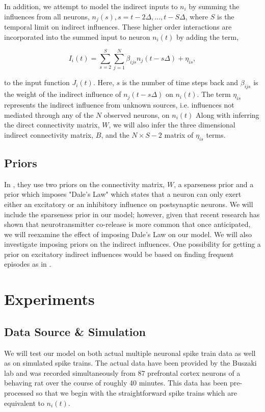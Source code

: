 \documentclass{article}
\begin{document}
In addition, we attempt to model the indirect inputs to $n_i$ by summing the influences from all neurons, $n_j(s), s=t-2\Delta,...,t-S\Delta$, where $S$ is the temporal limit on indirect influences. These higher order interactions are incorporated into the summed input to neuron $n_i(t)$ by adding the term,

\begin{equation}
\label{new_term}
I_i(t)=\displaystyle\sum\limits_{s=2}^S\sum\limits_{j=1}^N \beta_{ijs}n_j(t-s\Delta) + \eta_{is},
\end{equation}


to the input function $J_i(t)$. Here, $s$ is the number of time steps back and $\beta_{ijs}$ is the weight of the indirect influence of $n_j(t-s\Delta)$ on $n_i(t)$. The term $\eta_{is}$ represents the indirect influence from unknown sources, i.e. influences not mediated through any of the $N$ observed neurons, on $n_i(t)$  Along with inferring the direct connectivity matrix, $W$, we will also infer the three dimensional indirect connectivity matrix, $B$, and the $N\times S-2$ matrix of $\eta_{is}$ terms.

\subsection{Priors}

In \citep{mishchencko2011}, they use two priors on the connectivity matrix, $W$, a sparseness prior and a prior which imposes "Dale's Law" which states that a neuron can only exert either an excitatory or an inhibitory influence on postsynaptic neurons. We will include the sparseness prior in our model; however, given that recent research has shown that neurotransmitter co-release is more common that once anticipated, we will reexamine the effect of imposing Dale's Law on our model. We will also investigate imposing priors on the indirect influences. One possibility for getting a prior on excitatory indirect influences would be based on finding frequent episodes as in \citep{patnaik2011}.

\section{Experiments}

\subsection{Data Source \& Simulation}

We will test our model on both actual multiple neuronal spike train data as well as on simulated spike trains. The actual data have been provided by the Buszaki lab and was recorded simultaneously from 87 prefrontal cortex neurons of a behaving rat over the course of roughly 40 minutes. This data has been pre-processed so that we begin with the straightforward spike trains which are equivalent to $n_i(t)$.
\end{document}
